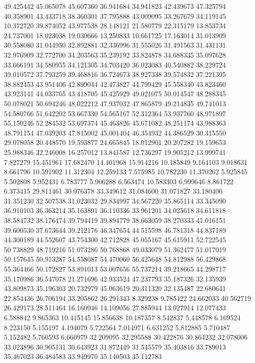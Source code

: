 49.425442
45.065078
45.607360
36.941684
34.941823
42.439673
47.325794
40.358901
43.433718
38.360301
37.795888
43.009095
33.267679
34.119145
10.372720
39.874052
43.977538
28.148121
21.580779
22.315179
13.853734
24.737001
18.023038
19.030666
13.250833
10.661725
17.163014
31.013909
30.558080
31.044950
32.892881
32.336996
31.555026
31.491563
31.431131
32.976909
32.772700
34.203563
35.239192
33.824878
34.688335
35.097628
33.666191
34.580955
34.121305
34.703420
36.023083
40.540882
38.229724
39.010572
37.793259
39.468816
36.724673
38.927338
39.574832
37.221395
38.882453
43.951406
42.899044
42.473827
44.799429
45.558340
43.823460
43.923141
44.033765
43.418705
45.425929
49.021075
50.014547
48.288345
50.078021
50.694246
48.022212
47.937032
47.865879
49.214835
49.741013
54.580766
51.642202
53.667330
54.565167
52.312364
53.937760
48.971897
55.150246
52.284532
53.697374
45.463826
45.671082
48.251174
43.988363
48.791154
47.039203
47.815002
45.001404
46.354932
44.386529
30.315550
29.078058
20.448570
19.593877
24.665845
18.012901
20.207282
19.159653
25.988346
32.246008
16.257012
13.841587
12.736297
19.905212
13.999741
7.827279
15.451961
17.682470
14.401968
15.914216
10.185849
9.164103
9.018631
8.661796
10.591902
11.312304
12.259133
7.575985
10.782230
11.370262
5.925845
5.502808
5.952431
6.783777
5.906288
6.563474
10.583303
6.999646
8.861722
6.373415
29.811461
30.076378
33.349612
31.084600
31.071827
33.180400
31.351230
32.507538
31.023032
29.834997
34.567220
35.865114
33.345090
36.910103
36.363214
35.163891
36.110336
33.961201
34.025618
34.611818
38.584732
38.176474
39.794419
39.894779
38.663059
38.270333
41.016151
39.600530
37.673644
39.212176
46.347654
44.515598
46.781318
44.837189
44.300189
44.552607
43.754300
42.712828
45.055167
45.615911
52.722545
50.738829
48.719216
51.073286
50.768868
49.033079
51.362477
51.017019
50.157645
50.913287
54.558087
54.470060
56.425648
54.812988
56.429868
55.364466
50.172827
53.891013
53.007656
55.737214
39.218665
44.298717
35.170986
36.547078
21.271696
42.933524
47.237793
35.187326
32.135939
43.809873
35.196303
20.732979
45.063619
20.311320
32.135487
22.680641
22.854436
26.706194
33.205862
26.291343
8.329238
9.785422
24.662033
40.562719
26.429173
28.511464
16.160946
14.109056
27.885944
13.027914
12.077433
6.588842
9.865363
10.415145
15.856638
10.187357
8.542837
5.448578
6.169524
8.223150
5.155197
4.194079
5.722564
7.014971
6.631252
5.812885
5.710487
5.152482
5.760593
6.660979
32.209095
32.295588
30.422876
30.864232
32.078006
33.023896
30.905131
30.643923
31.872449
31.545579
35.403816
33.789013
35.467023
36.484583
33.949970
35.140503
35.112783
